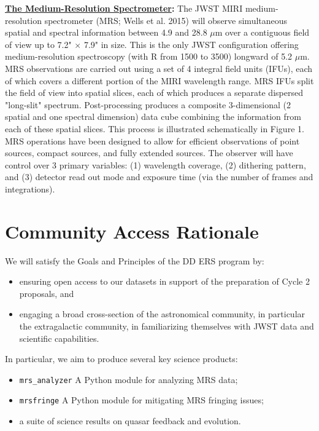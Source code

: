 \smallskip
\smallskip
\noindent
{\bf \underline{The Medium-Resolution Spectrometer}:}
The JWST MIRI medium-resolution spectrometer (MRS; Wells et al. 2015) will observe simultaneous spatial and spectral information between 4.9 and 28.8 $\mu$m over a contiguous field of view up to 7.2" × 7.9" in size. This is the only JWST configuration offering medium-resolution spectroscopy (with R from 1500 to 3500) longward of 5.2 $\mu$m.  \\

\noindent
MRS observations are carried out using a set of 4 integral field units
(IFUs), each of which covers a different portion of the MIRI
wavelength range. MRS IFUs split the field of view into spatial
slices, each of which produces a separate dispersed "long-slit"
spectrum. Post-processing produces a composite 3-dimensional (2
spatial and one spectral dimension) data cube combining the
information from each of these spatial slices. This process is
illustrated schematically in Figure 1.  MRS operations have been
designed to allow for efficient observations of point sources, compact
sources, and fully extended sources. The observer will have control
over 3 primary variables: (1) wavelength coverage, (2) dithering
pattern, and (3) detector read out mode and exposure time (via the
number of frames and integrations).



\section*{Community Access Rationale}
\noindent
We will satisfy the Goals and Principles of the DD ERS program by:
\begin{itemize}
\item ensuring open access to our datasets in support of the preparation of Cycle 2 proposals, and
\item engaging a broad cross-section of the astronomical community, in particular the extragalactic community, in familiarizing themselves with JWST data and scientific capabilities.
\end{itemize}

\noindent
In particular, we aim to produce several key science products:
\begin{itemize}
\item {\tt mrs\_analyzer} A Python module for analyzing MRS data; 
\item {\tt mrsfringe} A Python module for mitigating MRS fringing issues; 
\item a suite of science results on quasar feedback and evolution. 
\end{itemize}

